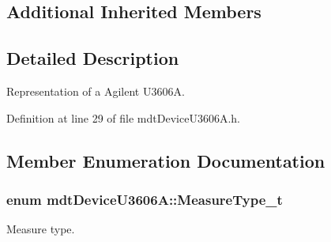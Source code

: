 \subsection*{Additional Inherited Members}


\subsection{Detailed Description}
Representation of a Agilent U3606\-A. 

Definition at line 29 of file mdt\-Device\-U3606\-A.\-h.



\subsection{Member Enumeration Documentation}
\hypertarget{classmdt_device_u3606_a_a75dc9c6f4c68da0106a6be067fd658b7}{
\subsubsection[{Measure\-Type\-\_\-t}]{\setlength{\rightskip}{0pt plus 5cm}enum {\bf mdt\-Device\-U3606\-A\-::\-Measure\-Type\-\_\-t}\hspace{0.3cm}{\ttfamily [strong]}}}\label{classmdt_device_u3606_a_a75dc9c6f4c68da0106a6be067fd658b7}


Measure type. 


